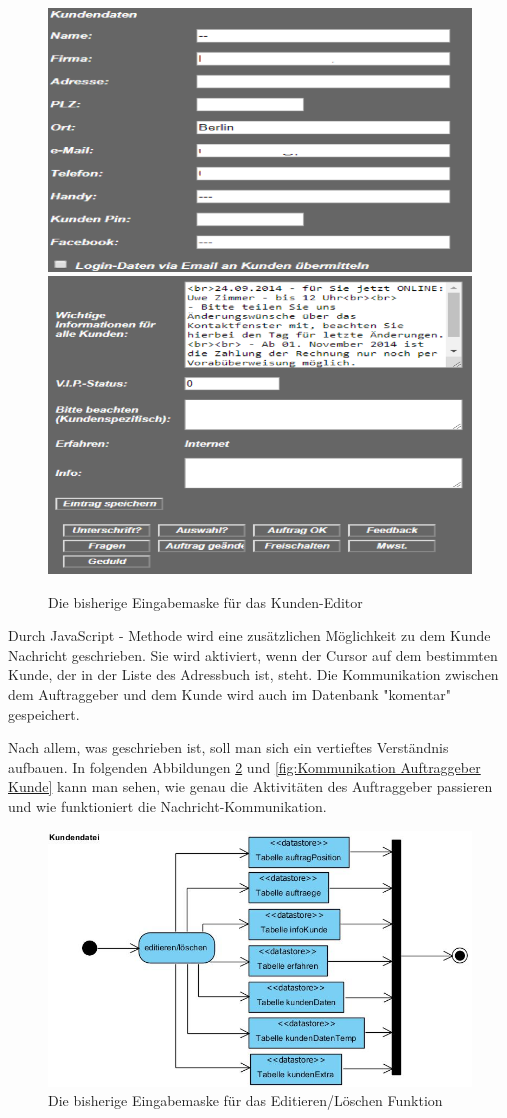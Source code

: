 \pagebreak

\begin{figure}[h]
	\centering
	\includegraphics[width=0.7\linewidth]{Graphics/kundeEditieren.png}
	\includegraphics[width=0.7\linewidth]{Graphics/kundeEditieren1.png}
	\caption[Kundeansicht]{Die bisherige Eingabemaske für das Kunden-Editor}
	\label{fig:Kunden Editor}
\end{figure}


Durch JavaScript - Methode wird eine zusätzlichen Möglichkeit zu dem Kunde Nachricht geschrieben. Sie wird aktiviert, wenn der Cursor auf dem bestimmten Kunde, der in der Liste des Adressbuch ist, steht. Die Kommunikation zwischen dem Auftraggeber und dem  Kunde wird auch im Datenbank "komentar" gespeichert. 

Nach allem, was geschrieben ist, soll man sich ein vertieftes Verständnis aufbauen. In folgenden Abbildungen \ref{fig:Kunden Datei Editieren und Löschen} und \ref{fig:Kommunikation Auftraggeber Kunde} kann man sehen, wie genau die Aktivitäten des Auftraggeber passieren und wie funktioniert die Nachricht-Kommunikation.
\pagebreak


\begin{figure}[h]
	\centering
	\includegraphics[width=0.7\linewidth]{Graphics/Kundendatei.JPG}
	\caption[Kundeansicht]{Die bisherige Eingabemaske für das Editieren/Löschen Funktion}
	\label{fig:Kunden Datei Editieren und Löschen}
\end{figure}

